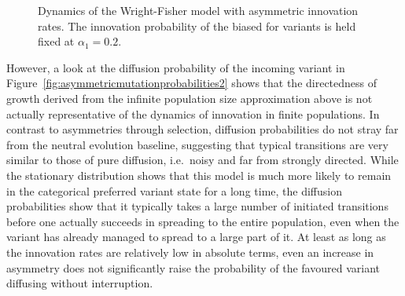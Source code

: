 \begin{knitrout}
\color{fgcolor}\begin{figure}[htbp]

{\centering {}

}

\caption[Dynamics of the Wright-Fisher model with asymmetric innovation rates]{Dynamics of the Wright-Fisher model with asymmetric innovation rates. The innovation probability of the biased for variants is held fixed at $\alpha_1=0.2$.}\label{fig:asymmetricmutationprobabilities}
\end{figure}


\end{knitrout}

However, a look at the diffusion probability of the incoming variant in Figure~\ref{fig:asymmetricmutationprobabilities2} shows that the directedness of growth derived from the infinite population size approximation above is not actually representative of the dynamics of innovation in finite populations. In contrast to asymmetries through selection, diffusion probabilities do not stray far from the neutral evolution baseline, suggesting that typical transitions are very similar to those of pure diffusion, i.e.~noisy and far from strongly directed.
While the stationary distribution shows that this model is much more likely to remain in the categorical preferred variant state for a long time, the diffusion probabilities show that it typically takes a large number of initiated transitions before one actually succeeds in spreading to the entire population, even when the variant has already managed to spread to a large part of it.
At least as long as the innovation rates are relatively low in absolute terms, even an increase in asymmetry does not significantly raise the probability of the favoured variant diffusing without interruption.


